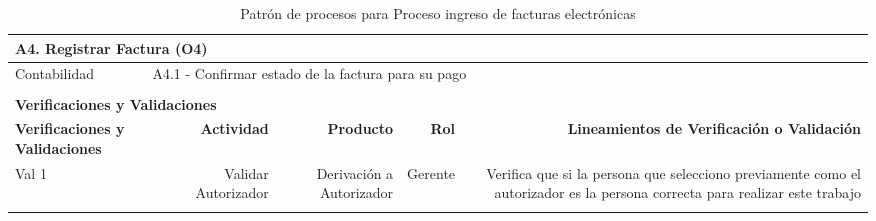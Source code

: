 \begin{longtable}{|llrrrrrr|}
    \multicolumn{8}{|l|}{\textbf{A4. Registrar Factura (O4)}} \\ \hline
    Contabilidad & \multicolumn{7}{|l|}{A4.1 - Confirmar estado de la factura para su pago} \\ \hline

     & & & & & & & \\ \hline
	\multicolumn{8}{|l|}{\textbf{Verificaciones y Validaciones}} \\ \hline
	\multicolumn{2}{|m{3cm}|}{\textbf{Verificaciones y Validaciones}} & \multicolumn{1}{m{2cm}|}{\textbf{Actividad}} & \multicolumn{1}{m{2,2cm}|}{\textbf{Producto}} & \multicolumn{1}{m{1.5cm}|}{\textbf{Rol}} &\multicolumn{3}{m{4cm}|}{\textbf{Lineamientos de Verificación o Validación}} \\ \hline

	\multicolumn{2}{|m{3cm}|}{Val 1} & \multicolumn{1}{m{2cm}|}{Validar Autorizador} & \multicolumn{1}{m{2.2cm}|}{Derivación a Autorizador} & \multicolumn{1}{m{2cm}|}{Gerente} & \multicolumn{3}{m{4cm}|}{Verifica que si la persona que selecciono previamente como el autorizador es la persona correcta para realizar este trabajo} \\ \hline
	
	\caption{Patrón de procesos para Proceso ingreso de facturas electrónicas}
\end{longtable}
